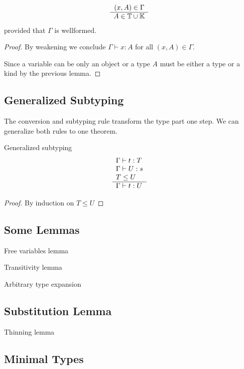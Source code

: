 \begin{corolary}
  $$
  \begin{array}{c} (x,A) \in \Gamma \\ \hline A \in \mathbb{T} \cup \mathbb{K}\end{array}
  $$
  provided that $\Gamma$ is wellformed.
  \begin{proof}
    By weakening we conclude $\Gamma \vdash x:A$ for all $(x,A) \in \Gamma$.

    Since a variable can be only an object or a type $A$ must be either a type
    or a kind by the previous lemma.
  \end{proof}
\end{corolary}


\subsection{Generalized Subtyping}

The conversion and subtyping rule transform the type part one step. We can
generalize both rules to one theorem.
\begin{theorem}
  \label{generalizedsubtyping}
  Generalized subtyping
  $$
  \begin{array}{l} 
    \Gamma \vdash t : T
    \\
    \Gamma \vdash U: s
    \\
    T \le U
   \\ \hline 
    \Gamma \vdash t : U
  \end{array}
  $$

  \begin{proof}
    By induction on $T \le U$
  \end{proof}
\end{theorem}


\subsection{Some Lemmas}

Free variables lemma

Transitivity lemma

Arbitrary type expansion


\subsection{Substitution Lemma}


Thinning lemma

\subsection{Minimal Types}


